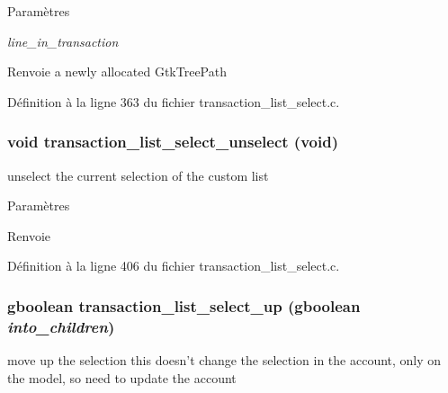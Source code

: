 \begin{DoxyParams}{Paramètres}
\item[{\em line\_\-in\_\-transaction}]\end{DoxyParams}
\begin{DoxyReturn}{Renvoie}
a newly allocated GtkTreePath 
\end{DoxyReturn}


Définition à la ligne 363 du fichier transaction\_\-list\_\-select.c.

\subsubsection[{transaction\_\-list\_\-select\_\-unselect}]{\setlength{\rightskip}{0pt plus 5cm}void transaction\_\-list\_\-select\_\-unselect (void)}\label{transaction__list__select_8c_afb819edf423709c65e5a7f0d427ddcf1}
unselect the current selection of the custom list


\begin{DoxyParams}{Paramètres}
\item[{\em }]\end{DoxyParams}
\begin{DoxyReturn}{Renvoie}

\end{DoxyReturn}


Définition à la ligne 406 du fichier transaction\_\-list\_\-select.c.

\subsubsection[{transaction\_\-list\_\-select\_\-up}]{\setlength{\rightskip}{0pt plus 5cm}gboolean transaction\_\-list\_\-select\_\-up (gboolean {\em into\_\-children})}\label{transaction__list__select_8c_afe4cb2b4907b0146fd152277511c5653}
move up the selection this doesn't change the selection in the account, only on the model, so need to update the account


